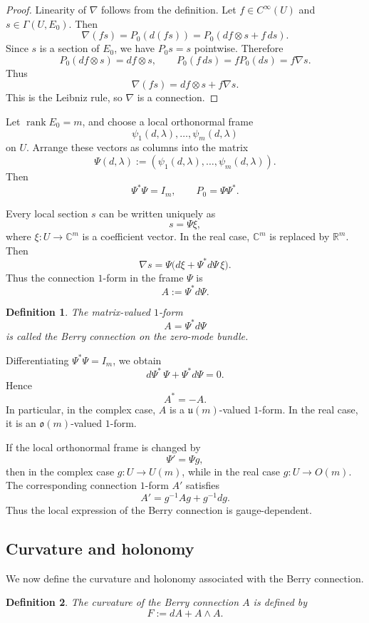 \documentclass[10pt,a4paper]{amsart}
\newtheorem{definition}{Definition}%
\begin{document}
\begin{proof}
Linearity of \(\nabla\) follows from the definition. Let \(f\in C^\infty(U)\) and \(s\in\Gamma(U,E_0)\). Then
\[
\nabla(fs)
=
P_0(d(fs))
=
P_0(df\otimes s+f\,ds).
\]
Since \(s\) is a section of \(E_0\), we have \(P_0s=s\) pointwise. Therefore
\[
P_0(df\otimes s)=df\otimes s,
\qquad
P_0(f\,ds)=fP_0(ds)=f\nabla s.
\]
Thus
\[
\nabla(fs)=df\otimes s+f\nabla s.
\]
This is the Leibniz rule, so \(\nabla\) is a connection.
\end{proof}

Let \(\operatorname{rank}E_0=m\), and choose a local orthonormal frame
\[
\psi_1(d,\lambda),\dots,\psi_m(d,\lambda)
\]
on \(U\). Arrange these vectors as columns into the matrix
\[
\Psi(d,\lambda)
:=
(\psi_1(d,\lambda),\dots,\psi_m(d,\lambda)).
\]
Then
\[
\Psi^\ast\Psi=I_m,
\qquad
P_0=\Psi\Psi^\ast.
\]

Every local section \(s\) can be written uniquely as
\[
s=\Psi\xi,
\]
where \(\xi:U\to\mathbb C^m\) is a coefficient vector. In the real case, \(\mathbb C^m\) is replaced by \(\mathbb R^m\). Then
\[
\nabla s
=
\Psi\bigl(d\xi+\Psi^\ast d\Psi\,\xi\bigr).
\]
Thus the connection \(1\)-form in the frame \(\Psi\) is
\[
A:=\Psi^\ast d\Psi.
\]

\begin{definition}
The matrix-valued \(1\)-form
\[
A=\Psi^\ast d\Psi
\]
is called the Berry connection on the zero-mode bundle.
\end{definition}

Differentiating \(\Psi^\ast\Psi=I_m\), we obtain
\[
d\Psi^\ast\,\Psi+\Psi^\ast d\Psi=0.
\]
Hence
\[
A^\ast=-A.
\]
In particular, in the complex case, \(A\) is a \(\mathfrak u(m)\)-valued \(1\)-form. In the real case, it is an \(\mathfrak o(m)\)-valued \(1\)-form.

If the local orthonormal frame is changed by
\[
\Psi'=\Psi g,
\]
then in the complex case \(g:U\to U(m)\), while in the real case \(g:U\to O(m)\). The corresponding connection \(1\)-form \(A'\) satisfies
\[
A'=g^{-1}Ag+g^{-1}dg.
\]
Thus the local expression of the Berry connection is gauge-dependent.

\subsection{Curvature and holonomy}

We now define the curvature and holonomy associated with the Berry connection.

\begin{definition}
The curvature of the Berry connection \(A\) is defined by
\[
F:=dA+A\wedge A.
\]
\end{definition}
\end{document}
